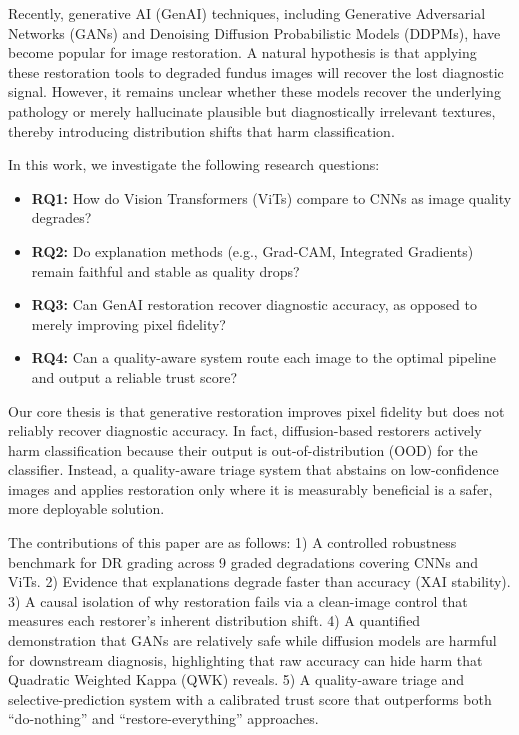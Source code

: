\documentclass[runningheads]{llncs}
\begin{document}
Recently, generative AI (GenAI) techniques, including Generative Adversarial Networks (GANs) and Denoising Diffusion Probabilistic Models (DDPMs), have become popular for image restoration. A natural hypothesis is that applying these restoration tools to degraded fundus images will recover the lost diagnostic signal. However, it remains unclear whether these models recover the underlying pathology or merely hallucinate plausible but diagnostically irrelevant textures, thereby introducing distribution shifts that harm classification.

In this work, we investigate the following research questions:
\begin{itemize}
    \item \textbf{RQ1:} How do Vision Transformers (ViTs) compare to CNNs as image quality degrades?
    \item \textbf{RQ2:} Do explanation methods (e.g., Grad-CAM, Integrated Gradients) remain faithful and stable as quality drops?
    \item \textbf{RQ3:} Can GenAI restoration recover diagnostic accuracy, as opposed to merely improving pixel fidelity?
    \item \textbf{RQ4:} Can a quality-aware system route each image to the optimal pipeline and output a reliable trust score?
\end{itemize}

Our core thesis is that generative restoration improves pixel fidelity but does not reliably recover diagnostic accuracy. In fact, diffusion-based restorers actively harm classification because their output is out-of-distribution (OOD) for the classifier. Instead, a quality-aware triage system that abstains on low-confidence images and applies restoration only where it is measurably beneficial is a safer, more deployable solution.

The contributions of this paper are as follows:
1) A controlled robustness benchmark for DR grading across 9 graded degradations covering CNNs and ViTs.
2) Evidence that explanations degrade faster than accuracy (XAI stability).
3) A causal isolation of why restoration fails via a clean-image control that measures each restorer's inherent distribution shift.
4) A quantified demonstration that GANs are relatively safe while diffusion models are harmful for downstream diagnosis, highlighting that raw accuracy can hide harm that Quadratic Weighted Kappa (QWK) reveals.
5) A quality-aware triage and selective-prediction system with a calibrated trust score that outperforms both ``do-nothing'' and ``restore-everything'' approaches.
\end{document}
